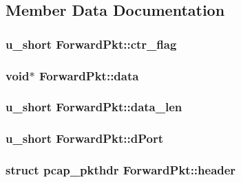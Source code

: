 \subsection{\-Member \-Data \-Documentation}
\hypertarget{structForwardPkt_a247f9e1e1c5f32d28229ef8ed8d31fc0}{
\subsubsection[{ctr\-\_\-flag}]{\setlength{\rightskip}{0pt plus 5cm}u\-\_\-short {\bf \-Forward\-Pkt\-::ctr\-\_\-flag}}}\label{structForwardPkt_a247f9e1e1c5f32d28229ef8ed8d31fc0}
\hypertarget{structForwardPkt_a2e4d0793dc8830d17f823d5979f3261f}{
\subsubsection[{data}]{\setlength{\rightskip}{0pt plus 5cm}void$\ast$ {\bf \-Forward\-Pkt\-::data}}}\label{structForwardPkt_a2e4d0793dc8830d17f823d5979f3261f}
\hypertarget{structForwardPkt_a57122c5602fe8f2707c3720317f3ee80}{
\subsubsection[{data\-\_\-len}]{\setlength{\rightskip}{0pt plus 5cm}u\-\_\-short {\bf \-Forward\-Pkt\-::data\-\_\-len}}}\label{structForwardPkt_a57122c5602fe8f2707c3720317f3ee80}
\hypertarget{structForwardPkt_a0c0acc33271ed0353b6ed34093240b8c}{
\subsubsection[{d\-Port}]{\setlength{\rightskip}{0pt plus 5cm}u\-\_\-short {\bf \-Forward\-Pkt\-::d\-Port}}}\label{structForwardPkt_a0c0acc33271ed0353b6ed34093240b8c}
\hypertarget{structForwardPkt_a302fdd75ab8fb5a475bc9a0c21db4fb7}{
\subsubsection[{header}]{\setlength{\rightskip}{0pt plus 5cm}struct pcap\-\_\-pkthdr {\bf \-Forward\-Pkt\-::header}}}\label{structForwardPkt_a302fdd75ab8fb5a475bc9a0c21db4fb7}
